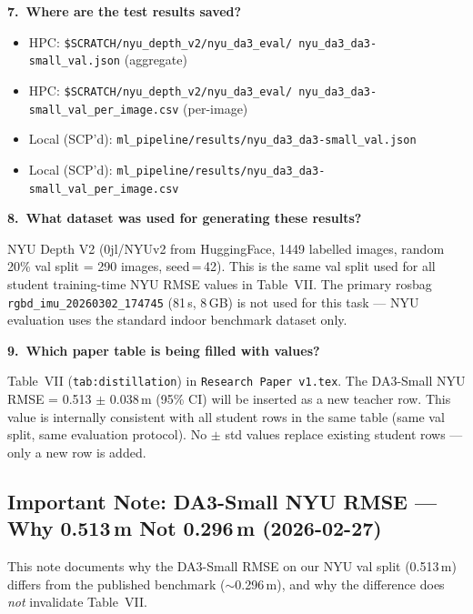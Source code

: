 \documentclass[11pt,a4paper]{article}
\begin{document}
\textbf{7.\ Where are the test results saved?}

\begin{itemize}
  \item HPC:
    \texttt{\$SCRATCH/nyu\_depth\_v2/nyu\_da3\_eval/%
      nyu\_da3\_da3-small\_val.json} (aggregate)
  \item HPC:
    \texttt{\$SCRATCH/nyu\_depth\_v2/nyu\_da3\_eval/%
      nyu\_da3\_da3-small\_val\_per\_image.csv} (per-image)
  \item Local (SCP'd):
    \texttt{ml\_pipeline/results/nyu\_da3\_da3-small\_val.json}
  \item Local (SCP'd):
    \texttt{ml\_pipeline/results/nyu\_da3\_da3-small\_val\_per\_image.csv}
\end{itemize}

\textbf{8.\ What dataset was used for generating these results?}

NYU Depth V2 (0jl/NYUv2 from HuggingFace, 1449 labelled images,
random 20\% val split = 290 images, seed\,=\,42).  This is the same
val split used for all student training-time NYU RMSE values in
Table~VII.  The primary rosbag
\texttt{rgbd\_imu\_20260302\_174745} (81\,s, 8\,GB) is not used for
this task — NYU evaluation uses the standard indoor benchmark dataset
only.

\textbf{9.\ Which paper table is being filled with values?}

Table~VII (\texttt{tab:distillation}) in
\texttt{Research Paper v1.tex}.  The DA3-Small NYU RMSE =
0.513 $\pm$ 0.038\,m (95\% CI) will be inserted as a new teacher
row.  This value is internally consistent with all student rows in
the same table (same val split, same evaluation protocol).  No
$\pm$ std values replace existing student rows — only a new row is
added.


\subsection*{Important Note: DA3-Small NYU RMSE — Why 0.513\,m Not
  0.296\,m (2026-02-27)}

This note documents why the DA3-Small RMSE on our NYU val split
(0.513\,m) differs from the published benchmark ($\sim$0.296\,m),
and why the difference does \emph{not} invalidate Table~VII.
\end{document}
